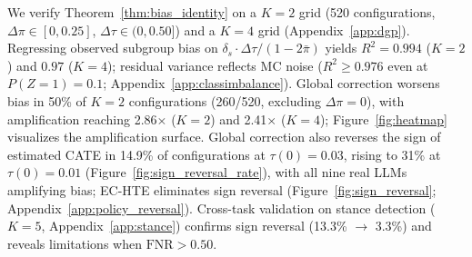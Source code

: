 \begin{table}[t]
\centering
\caption{Results under moderate heterogeneity and semi-synthetic data. Moderate: $\Delta\pi \leq 0.10$; TweetEval: empirical subgroup structure ($K{=}4$). Metrics averaged over subgroups, $z$-levels, 100 MC runs. $^\dagger$RMSE exceeds Global.}
\label{tab:main_supp}
\small
{}
\end{table}

We verify Theorem~\ref{thm:bias_identity} on a $K{=}2$ grid (520 configurations, $\Delta\pi \in [0, 0.25]$, $\Delta\tau \in (0, 0.50]$) and a $K{=}4$ grid (Appendix~\ref{app:dgp}).
Regressing observed subgroup bias on $\delta_s \cdot \Delta\tau / (1{-}2\bar{\pi})$ yields $R^2 = 0.994$ ($K{=}2$) and $0.97$ ($K{=}4$); residual variance reflects MC noise ($R^2 \geq 0.976$ even at $P(Z{=}1) = 0.1$; Appendix~\ref{app:classimbalance}).
Global correction worsens bias in 50\% of $K{=}2$ configurations (260/520, excluding $\Delta\pi{=}0$), with amplification reaching 2.86$\times$ ($K{=}2$) and 2.41$\times$ ($K{=}4$); Figure~\ref{fig:heatmap} visualizes the amplification surface.
Global correction also reverses the sign of estimated CATE in 14.9\% of configurations at $\tau(0) = 0.03$, rising to 31\% at $\tau(0) = 0.01$ (Figure~\ref{fig:sign_reversal_rate}), with all nine real LLMs amplifying bias; EC-HTE eliminates sign reversal (Figure~\ref{fig:sign_reversal}; Appendix~\ref{app:policy_reversal}).
Cross-task validation on stance detection ($K{=}5$, Appendix~\ref{app:stance}) confirms sign reversal (13.3\% $\to$ 3.3\%) and reveals limitations when $\mathrm{FNR} > 0.50$.

